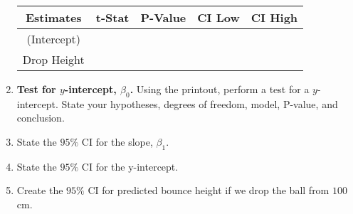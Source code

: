 \documentclass[12pt]{amsart}
\theoremstyle{definition}
\begin{document}
\begin{center}
\begin{enumerate}
\begin{center}
\begin{tabular}{|c|c|c|c|c|}
\hline
Estimates &  t-Stat & P-Value & CI Low & CI High\\
\hline
(Intercept)& & &  \\
\hline
Drop Height& & & \\
\hline
\end{tabular}
\end{center}
\item \textbf{Test for $y$-intercept, $\beta_0$.} Using the printout, perform a test for a $y$-intercept. State your hypotheses, degrees of freedom, model, P-value, and conclusion.
\vfill
\vfill
\item State the $95\%$ CI for the slope, $\beta_1$.
\vfill
\item State the  $95\%$ CI for the y-intercept.
\vfill
\item Create the $95\%$ CI for predicted bounce height if we drop the ball from $100$ cm.
\vfill
\end{enumerate}
\end{center}
\end{document}
